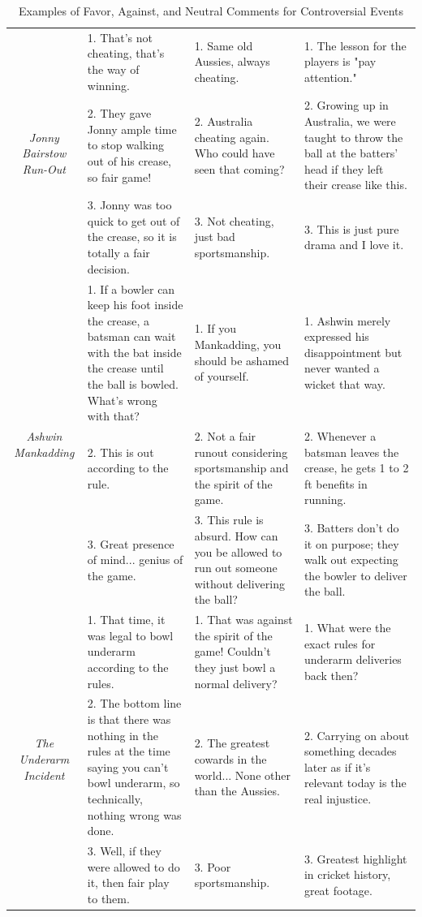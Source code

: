 \documentclass[sigconf, review]{acmart}
\begin{document}
\begin{table}[htbp]
{\begin{tabular}{|c|p{4cm}|p{4cm}|p{4cm}|}
            \hline
            \multirow{3}{*}{\textit{Jonny Bairstow Run-Out}} 
            & 1. That's not cheating, that's the way of winning.  & 1. Same old Aussies, always cheating. & 1. The lesson for the players is "pay attention." \\
            & 2. They gave Jonny ample time to stop walking out of his crease, so fair game! & 2. Australia cheating again. Who could have seen that coming? & 2. Growing up in Australia, we were taught to throw the ball at the batters' head if they left their crease like this. \\
            & 3. Jonny was too quick to get out of the crease, so it is totally a fair decision. & 3. Not cheating, just bad sportsmanship. & 3. This is just pure drama and I love it. \\
            \hline
            \multirow{3}{*}{\textit{Ashwin Mankadding}} 
            & 1. If a bowler can keep his foot inside the crease, a batsman can wait with the bat inside the crease until the ball is bowled. What's wrong with that? & 1. If you Mankadding, you should be ashamed of yourself. & 1. Ashwin merely expressed his disappointment but never wanted a wicket that way. \\
            & 2. This is out according to the rule. & 2. Not a fair runout considering sportsmanship and the spirit of the game. & 2. Whenever a batsman leaves the crease, he gets 1 to 2 ft benefits in running. \\
            & 3. Great presence of mind... genius of the game. & 3. This rule is absurd. How can you be allowed to run out someone without delivering the ball? & 3. Batters don’t do it on purpose; they walk out expecting the bowler to deliver the ball. \\
            \hline
            \multirow{3}{*}{\textit{The Underarm Incident}} 
            & 1. That time, it was legal to bowl underarm according to the rules. & 1. That was against the spirit of the game! Couldn't they just bowl a normal delivery? & 1. What were the exact rules for underarm deliveries back then? \\
            & 2. The bottom line is that there was nothing in the rules at the time saying you can't bowl underarm, so technically, nothing wrong was done. & 2. The greatest cowards in the world... None other than the Aussies. & 2. Carrying on about something decades later as if it's relevant today is the real injustice. \\
            & 3. Well, if they were allowed to do it, then fair play to them. & 3. Poor sportsmanship. & 3. Greatest highlight in cricket history, great footage. \\
            \hline
        \end{tabular}%
    }
    \caption{Examples of Favor, Against, and Neutral Comments for Controversial Events}
    \label{tab:event_comments}
\end{table}
\end{document}
